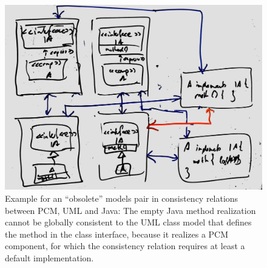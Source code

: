 \begin{figure}
    \centering
    \includegraphics[width=\textwidth]{figures/correctness/compatibility/obsolete_relations_scenario.jpg}
    \caption[Example for obsolete relation elements between PCM, UML and Java]{Example for an \enquote{obsolete} models pair in consistency relations between \gls{PCM}, UML and Java: The empty Java method realization cannot be globally consistent to the UML class model that defines the method in the class interface, because it realizes a \gls{PCM} component, for which the consistency relation requires at least a default implementation.}
    \label{fig:compatibility:obsolete_relations_scenario}
\end{figure}

